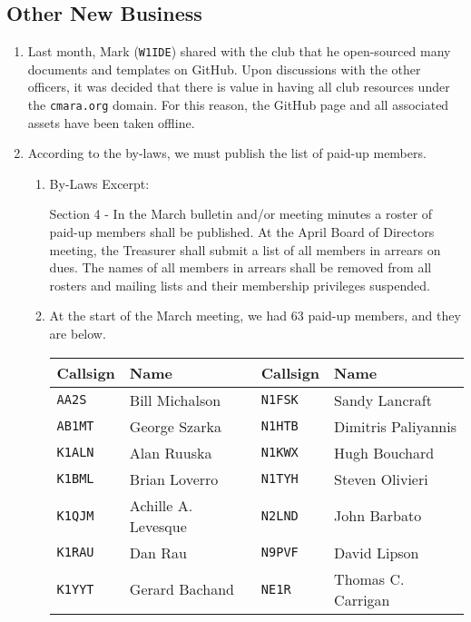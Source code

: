 \documentclass[10pt,letterpaper]{article}
\begin{document}
\subsection{Other New Business}
\begin{enumerate}
  \item Last month, Mark (\texttt{W1IDE}) shared with the club that he open-sourced many documents and templates on GitHub. Upon discussions with the other officers, it was decided that there is value in having all club resources under the \texttt{cmara.org} domain. For this reason, the GitHub page and all associated assets have been taken offline.

  \newpage
  \item According to the by-laws, we must publish the list of paid-up members.
  \begin{enumerate}
  \item By-Laws Excerpt:
    \begin{tcolorbox}
Section 4 - In the March bulletin and/or meeting minutes a roster of paid-up members shall be published. At the April Board of Directors meeting, the Treasurer shall submit a list of all members in arrears on dues. The names of all members in arrears shall be removed from all rosters and mailing lists and their membership privileges suspended.
  \end{tcolorbox}
  \item At the start of the March meeting, we had 63 paid-up members, and they are below. \\
  \begin{tabular}{|ll||ll|}
  \hline
  \textbf{Callsign} & \textbf{Name} & \textbf{Callsign} & \textbf{Name} \\
  \hline
  \texttt{AA2S}   & Bill Michalson      & \texttt{N1FSK}  & Sandy Lancraft      \\
  \texttt{AB1MT}  & George Szarka       & \texttt{N1HTB}  & Dimitris Paliyannis \\
  \texttt{K1ALN}  & Alan Ruuska         & \texttt{N1KWX}  & Hugh Bouchard       \\
  \texttt{K1BML}  & Brian Loverro       & \texttt{N1TYH}  & Steven Olivieri     \\
  \texttt{K1QJM}  & Achille A. Levesque & \texttt{N2LND}  & John Barbato        \\
  \texttt{K1RAU}  & Dan Rau             & \texttt{N9PVF}  & David Lipson        \\
  \texttt{K1YYT}  & Gerard Bachand      & \texttt{NE1R}   & Thomas C. Carrigan  \\

\end{tabular}
\end{enumerate}
\end{enumerate}
\end{document}
